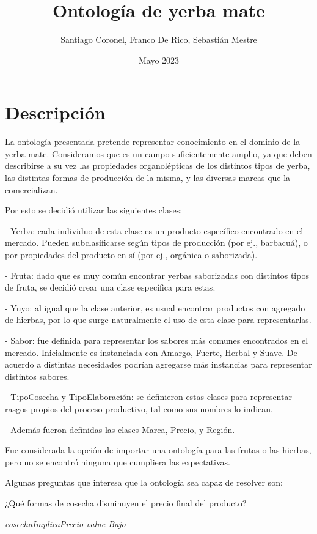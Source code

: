 \documentclass[12pt]{report}
\title{Ontología de yerba mate}
\author{Santiago Coronel, Franco De Rico, Sebastián Mestre}
\date{Mayo 2023}
\theoremstyle{plain} %
\begin{document}
\maketitle
\eject

\section*{Descripción}

La ontología presentada pretende representar conocimiento en el dominio de la yerba mate. Consideramos que es un campo suficientemente amplio, ya que deben describirse a su vez las propiedades organolépticas de los distintos tipos de yerba, las distintas formas de producción de la misma, y las diversas marcas que la comercializan.

Por esto se decidió utilizar las siguientes clases:

- Yerba: cada individuo de esta clase es un producto específico encontrado en el mercado. Pueden subclasificarse según tipos de producción (por ej., barbacuá), o por propiedades del producto en sí (por ej., orgánica o saborizada).

- Fruta: dado que es muy común encontrar yerbas saborizadas con distintos tipos de fruta, se decidió crear una clase específica para estas.

- Yuyo: al igual que la clase anterior, es usual encontrar productos con agregado de hierbas, por lo que surge naturalmente el uso de esta clase para representarlas.

- Sabor: fue definida para representar los sabores más comunes encontrados en el mercado. Inicialmente es instanciada con Amargo, Fuerte, Herbal y Suave. De acuerdo a distintas necesidades podrían agregarse más instancias para representar distintos sabores.

- TipoCosecha y TipoElaboración: se definieron estas clases para representar rasgos propios del proceso productivo, tal como sus nombres lo indican.

- Además fueron definidas las clases Marca, Precio, y Región.

\bigskip
Fue considerada la opción de importar una ontología para las frutas o las hierbas, pero no se encontró ninguna que cumpliera las expectativas.

Algunas preguntas que interesa que la ontología sea capaz de resolver son:

¿Qué formas de cosecha disminuyen el precio final del producto? 

\textit{cosechaImplicaPrecio value Bajo}
\end{document}

